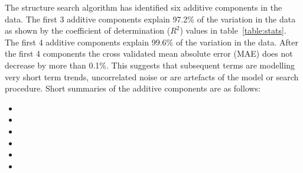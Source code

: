 \documentclass{article} %
\begin{document}
The structure search algorithm has identified six additive components in the data.
The  first 3 additive components explain 97.2\% of the variation in the data as shown by the coefficient of determination ($R^2$) values in table~\ref{table:stats}.
The  first 4 additive components explain 99.6\% of the variation in the data.
After the first 4 components the cross validated mean absolute error (MAE) does not decrease by more than 0.1\%.
This suggests that subsequent terms are modelling very short term trends, uncorrelated noise or are artefacts of the model or search procedure.
Short summaries of the additive components are as follows:
\begin{itemize}

  \item  

  \item  

  \item  

  \item  

  \item  

  \item  

\end{itemize}
\end{document}
